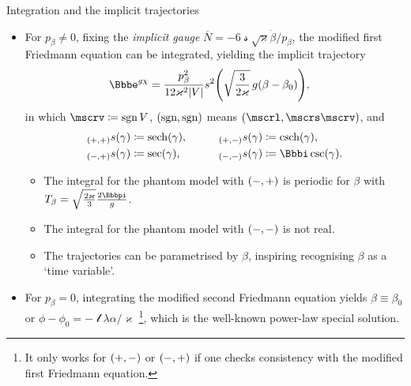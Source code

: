 \documentclass[8pt]{beamer}
\begin{document}
\begin{frame}%
{Integration and the implicit trajectories}%
\begin{itemize}


\item For $p_\beta \neq 0$, fixing the \emph{implicit gauge}
$\overline{N} = -6\mscrs\sqrt{\varkappa}\dot{\beta}/p_\beta$, the modified
first Friedmann equation can be integrated, yielding the \alert{implicit}
trajectory
\begin{align}
\ee^{g\chi} &=
\frac{p_\beta^2}{12\varkappa^2\vbr{V}}
\rfun{s^2}{ \sqrt{\frac{3}{2\varkappa}}\,g \rbr{\beta-\beta_0}},
\end{align}
in which $\mscrv \coloneqq \sgn V$, ${\left(\mathrm{sgn},\mathrm{sgn}\right)}$ means 
$\rbr{\mscrl,\mscrs\mscrv}$, and
\begin{align}
\begin{aligned}
\rfun{{}_{\rbr{+,+}}s}{\gamma} &\coloneqq \rfun{\sech}{\gamma},
&\qquad
\rfun{{}_{\rbr{+,-}}s}{\gamma} &\coloneqq \rfun{\csch}{\gamma},\\
\rfun{{}_{\rbr{-,+}}s}{\gamma} &\coloneqq \rfun{\sec}{\gamma},
&\qquad
\rfun{{}_{\rbr{-,-}}s}{\gamma} &\coloneqq \rfun{\ii\csc}{\gamma}.\\
\end{aligned}
\end{align}
\begin{itemize}
\item The integral for the phantom model with ${\left(-,+\right)}$ is periodic for
$\beta$ with $T_\beta = \sqrt{\frac{2\varkappa}{3}}\frac{2\pp}{g}$.
\item The integral for the phantom model with ${\left(-,-\right)}$ is not real.
\item The trajectories can be parametrised by $\beta$, inspiring recognising
$\beta$ as a `time variable'.
\end{itemize}

\item For $p_\beta = 0$, integrating the modified second Friedmann 
equation yields $\beta \equiv \beta_0$ or $\phi-\phi_0 =
-\mscrl\lambda\alpha/\varkappa$%
\footnote{It only works for ${\left(+,-\right)}$ or ${\left(-,+\right)}$ if one checks consistency
with the modified first Friedmann equation.}, which is the well-known power-law
special solution.


\end{itemize}
\end{frame}
\end{document}
